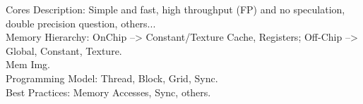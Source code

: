 Cores Description: Simple and fast, high throughput (FP) and no speculation, double precision question, others...\\

Memory Hierarchy: OnChip --> Constant/Texture Cache, Registers; Off-Chip --> Global, Constant, Texture.\\
Mem Img. \\

Programming Model: Thread, Block, Grid, Sync.\\

Best Practices: Memory Accesses, Sync, others.\\
